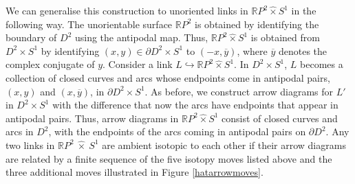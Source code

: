 \documentclass[12pt]{amsproc}
\begin{document}
We can generalise this construction to unoriented links in $\mathbb RP^2 \hat \times S^1$ in the following way. The unorientable surface $\mathbb RP^2$ is obtained by identifying the boundary of $D^2$ using the antipodal map. Thus, $\mathbb RP^2 \hat \times S^1$ is obtained from $D^2 \times S^1$ by identifying $(x,y) \in \partial D^2 \times S^1$ to $(-x,\overline y)$, where $\overline y$ denotes the complex conjugate of $y$. Consider a link $L \hookrightarrow \mathbb RP^2 \hat \times S^1$. In $D^2 \times S^1$, $L$ becomes a collection of closed curves and arcs whose endpoints come in antipodal pairs, $(x,y)$ and $(x, \overline y)$, in $\partial D^2 \times S^1$. As before, we construct arrow diagrams for $L'$ in $D^2 \times S^1$ with the difference that now the arcs have endpoints that appear in antipodal pairs. Thus, arrow diagrams in $\mathbb RP^2 \hat \times S^1$ consist of closed curves and arcs in $D^2$, with the endpoints of the arcs coming in antipodal pairs on $\partial D^2$. Any two links in $\mathbb RP^2 \ \hat\times \ S^1$ are ambient isotopic to each other if their arrow diagrams are related by a finite sequence of the five isotopy moves listed above and the three additional moves illustrated in Figure \ref{hatarrowmoves}. \\%
\end{document}
